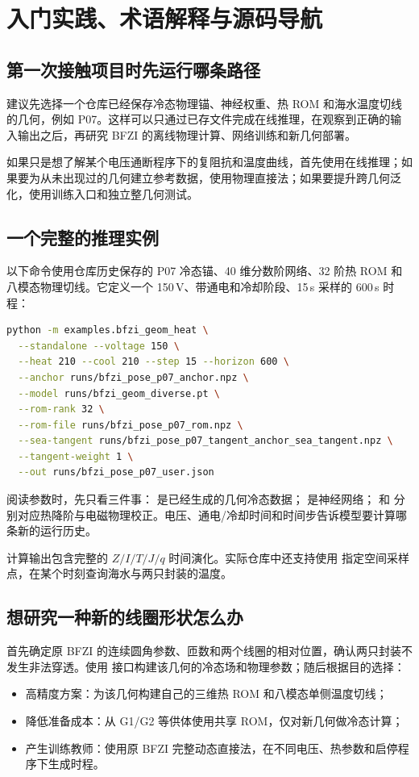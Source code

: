 \chapter{入门实践、术语解释与源码导航}
\label{ch:guide}

\section{第一次接触项目时先运行哪条路径}
建议先选择一个仓库已经保存冷态物理锚、神经权重、热 ROM 和海水温度切线的几何，例如 P07。这样可以只通过已存文件完成在线推理，在观察到正确的输入输出之后，再研究 BFZI 的离线物理计算、网络训练和新几何部署。

如果只是想了解某个电压通断程序下的复阻抗和温度曲线，首先使用在线推理；如果要为从未出现过的几何建立参考数据，使用物理直接法；如果要提升跨几何泛化，使用训练入口和独立整几何测试。

\section{一个完整的推理实例}
以下命令使用仓库历史保存的 P07 冷态锚、40 维分数阶网络、32 阶热 ROM 和八模态物理切线。它定义一个 150\,V、带通电和冷却阶段、15\,s 采样的 600\,s 时程：

\begin{lstlisting}[language=bash,caption={不执行在线 BFZI Green 电磁求解的 P07 推理}]
python -m examples.bfzi_geom_heat \
  --standalone --voltage 150 \
  --heat 210 --cool 210 --step 15 --horizon 600 \
  --anchor runs/bfzi_pose_p07_anchor.npz \
  --model runs/bfzi_geom_diverse.pt \
  --rom-rank 32 \
  --rom-file runs/bfzi_pose_p07_rom.npz \
  --sea-tangent runs/bfzi_pose_p07_tangent_anchor_sea_tangent.npz \
  --tangent-weight 1 \
  --out runs/bfzi_pose_p07_user.json
\end{lstlisting}

阅读参数时，先只看三件事：\code{--anchor} 是已经生成的几何冷态数据； 是神经网络； 和  分别对应热降阶与电磁物理校正。电压、通电/冷却时间和时间步告诉模型要计算哪条新的运行历史。

计算输出包含完整的 $Z/I/T/J/q$ 时间演化。实际仓库中还支持使用  指定空间采样点，在某个时刻查询海水与两只封装的温度。

\section{想研究一种新的线圈形状怎么办}
首先确定原 BFZI 的连续圆角参数、匝数和两个线圈的相对位置，确认两只封装不发生非法穿透。使用  接口构建该几何的冷态场和物理参数；随后根据目的选择：
\begin{itemize}
\item 高精度方案：为该几何构建自己的三维热 ROM 和八模态单侧温度切线；
\item 降低准备成本：从 G1/G2 等供体使用共享 ROM，仅对新几何做冷态计算；
\item 产生训练教师：使用原 BFZI 完整动态直接法，在不同电压、热参数和启停程序下生成时程。
\end{itemize}

